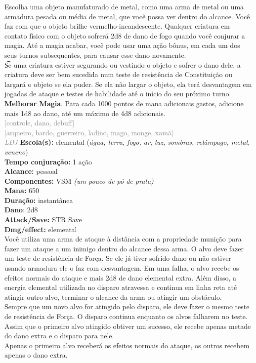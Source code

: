 \documentclass{RPG_Adventure}[2021/10/20]
\begin{document}
{\normalsize Escolha uma objeto manufaturado de metal, como uma arma de metal ou uma armadura pesada ou média de metal, que você possa ver dentro do alcance. Você faz com que o objeto brilhe vermelho-incandescente. Qualquer criatura em contato físico com o objeto sofrerá 2d8 de dano de fogo quando você conjurar a magia. Até a magia acabar, você pode usar uma ação bônus, em cada um dos seus turnos subsequentes, para causar esse dano novamente.\\\t Se uma criatura estiver segurando ou vestindo o objeto e sofrer o dano dele, a criatura deve ser bem sucedida num teste de resistência de Constituição ou largará o objeto se ela puder. Se ela não largar o objeto, ela terá desvantagem em jogadas de ataque e testes de habilidade até o início do seu próximo turno.\\\t \textbf{Melhorar Magia}. Para cada 1000 pontos de mana adicionais gastos, adicione mais 1d8 ao dano, até um máximo de 4d8 adicionais.\\}
{\scriptsize \textcolor{gray}{[controle, dano, debuff]\\}}
{\scriptsize \textcolor{gray}{[arqueiro, bardo, guerreiro, ladino, mago, monge, xamã]\\}}
{\tiny \textcolor{gray}{\textit{LDJ}}}\jump{}
{\small \t \textbf{Escola(s):} elemental (\textit{água, terra, fogo, ar, luz, sombras, relâmpago, metal, veneno})\\\t \textbf{Tempo conjuração:} 1 ação\\\t \textbf{Alcance:} pessoal\\\t \textbf{Componentes:} VSM \textit{(um pouco de pó de prata)}\\\t \textbf{Mana:} 650\\\t \textbf{Duração:} instantânea\\\t \textbf{Dano}: 2d8\\\t \textbf{Attack/Save:} STR Save\\\t \textbf{Dmg/effect:} elemental\\}
{\normalsize Você utiliza uma arma de ataque à distância com a propriedade munição para fazer um ataque a um inimigo dentro do alcance dessa arma. O alvo deve fazer um teste de resistência de Força. Se ele já tiver sofrido dano ou não estiver usando armadura ele o faz com desvantagem. Em uma falha, o alvo recebe os efeitos normais do ataque e mais 2d8 de dano elemental extra. Além disso, a energia elemental utilizada no disparo atravessa e continua em linha reta até atingir outro alvo, terminar o alcance da arma ou atingir um obstáculo.\\Sempre que um novo alvo for atingido pelo disparo, ele deve fazer o mesmo teste de resistência de Força. O disparo continua enquanto os alvos falharem no teste. Assim que o primeiro alvo atingido obtiver um sucesso, ele recebe apenas metade do dano extra e o disparo para nele.\\Apenas o primeiro alvo receberá os efeitos normais do ataque, os outros recebem apenas o dano extra.\\}
\end{document}
